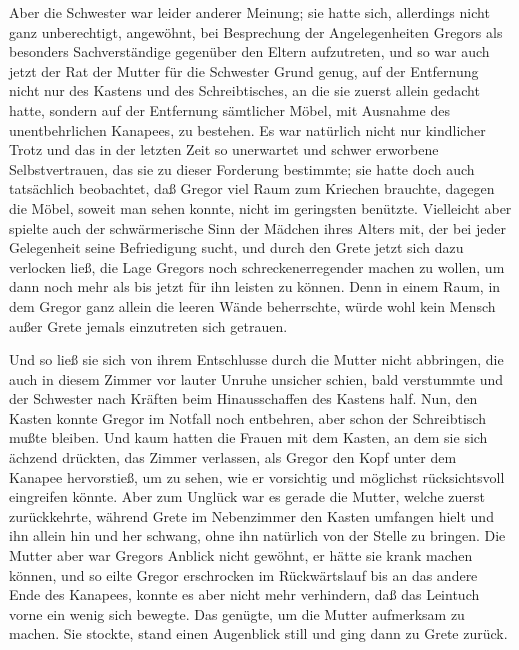 Aber die Schwester war leider anderer Meinung; sie hatte sich,
allerdings nicht ganz unberechtigt, angewöhnt, bei Besprechung der
Angelegenheiten Gregors als besonders Sachverständige gegenüber den
Eltern aufzutreten, und so war auch jetzt der Rat der Mutter für die
Schwester Grund genug, auf der Entfernung nicht nur des Kastens und des
Schreibtisches, an die sie zuerst allein gedacht hatte, sondern auf der
Entfernung sämtlicher Möbel, mit Ausnahme des unentbehrlichen Kanapees,
zu bestehen. Es war natürlich nicht nur kindlicher Trotz und das in der
letzten Zeit so unerwartet und schwer erworbene Selbstvertrauen, das sie
zu dieser Forderung bestimmte; sie hatte doch auch tatsächlich
beobachtet, daß Gregor viel Raum zum Kriechen brauchte, dagegen die
Möbel, soweit man sehen konnte, nicht im geringsten benützte. Vielleicht
aber spielte auch der schwärmerische Sinn der Mädchen ihres Alters mit,
der bei jeder Gelegenheit seine Befriedigung sucht, und durch den Grete
jetzt sich dazu verlocken ließ, die Lage Gregors noch
schreckenerregender machen zu wollen, um dann noch mehr als bis jetzt
für ihn leisten zu können. Denn in einem Raum, in dem Gregor ganz allein
die leeren Wände beherrschte, würde wohl kein Mensch außer Grete jemals
einzutreten sich getrauen.

Und so ließ sie sich von ihrem Entschlusse durch die Mutter nicht
abbringen, die auch in diesem Zimmer vor lauter Unruhe unsicher schien,
bald verstummte und der Schwester nach Kräften beim Hinausschaffen des
Kastens half. Nun, den Kasten konnte Gregor im Notfall noch entbehren,
aber schon der Schreibtisch mußte bleiben. Und kaum hatten die Frauen
mit dem Kasten, an dem sie sich ächzend drückten, das Zimmer verlassen,
als Gregor den Kopf unter dem Kanapee hervorstieß, um zu sehen, wie er
vorsichtig und möglichst rücksichtsvoll eingreifen könnte. Aber zum
Unglück war es gerade die Mutter, welche zuerst zurückkehrte, während
Grete im Nebenzimmer den Kasten umfangen hielt und ihn allein hin und
her schwang, ohne ihn natürlich von der Stelle zu bringen. Die Mutter
aber war Gregors Anblick nicht gewöhnt, er hätte sie krank machen
können, und so eilte Gregor erschrocken im Rückwärtslauf bis an das
andere Ende des Kanapees, konnte es aber nicht mehr verhindern, daß das
Leintuch vorne ein wenig sich bewegte. Das genügte, um die Mutter
aufmerksam zu machen. Sie stockte, stand einen Augenblick still und ging
dann zu Grete zurück.

